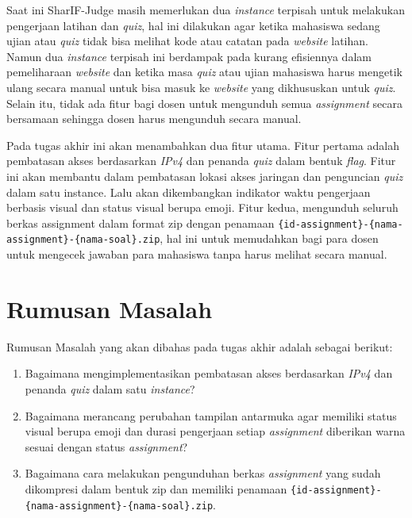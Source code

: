 \documentclass[a4paper,twoside]{article}
\begin{document}
	Saat ini SharIF-Judge masih memerlukan dua \textit{instance} terpisah untuk melakukan pengerjaan latihan dan \textit{quiz}, hal ini dilakukan agar ketika mahasiswa sedang ujian atau \textit{quiz} tidak bisa melihat kode atau catatan pada \textit{website} latihan. Namun dua \textit{instance} terpisah ini berdampak pada kurang efisiennya dalam pemeliharaan \textit{website} dan ketika masa \textit{quiz} atau ujian mahasiswa harus mengetik ulang secara manual untuk bisa masuk ke \textit{website} yang dikhususkan untuk \textit{quiz}. Selain itu, tidak ada fitur bagi dosen untuk mengunduh semua \textit{assignment} secara bersamaan sehingga dosen harus mengunduh secara manual.

	Pada tugas akhir ini akan menambahkan dua fitur utama. Fitur pertama adalah pembatasan akses berdasarkan \textit{IPv4} dan penanda \textit{quiz} dalam bentuk \textit{flag}. Fitur ini akan membantu dalam pembatasan lokasi akses jaringan dan penguncian \textit{quiz} dalam satu instance. Lalu akan dikembangkan indikator waktu pengerjaan berbasis visual dan status visual berupa emoji. Fitur kedua, mengunduh seluruh berkas assignment dalam format zip dengan penamaan \texttt{\{id-assignment\}-\{nama-assignment\}-\{nama-soal\}.zip}, hal ini untuk memudahkan bagi para dosen untuk mengecek jawaban para mahasiswa tanpa harus melihat secara manual.
		
	
	\section{Rumusan Masalah}
	Rumusan Masalah yang akan dibahas pada tugas akhir adalah sebagai berikut:
	\begin{enumerate}
     \item Bagaimana mengimplementasikan pembatasan akses berdasarkan \textit{IPv4} dan penanda \textit{quiz} dalam satu \textit{instance}?
     \item Bagaimana merancang perubahan tampilan antarmuka agar memiliki status visual berupa emoji dan durasi pengerjaan setiap \textit{assignment} diberikan warna sesuai dengan status \textit{assignment}?
     \item Bagaimana cara melakukan pengunduhan berkas \textit{assignment} yang sudah dikompresi dalam bentuk zip dan memiliki penamaan \texttt{\{id-assignment\}-\{nama-assignment\}-\{nama-soal\}.zip}.
 	\end{enumerate}
\end{document}
